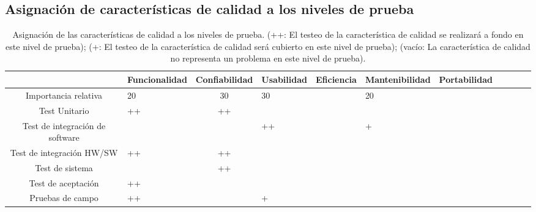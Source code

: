 \documentclass[11pt]{article}
\begin{document}
\subsection{Asignación de características de calidad a los niveles de prueba}
\FloatBarrier
\begin{table}[!ht]
    \centering

    \begin{tabularx}{\linewidth}{@{}|c|X|c|X|c|X|c|X|c|X|c|@{}}\hline \hline
        \rowcolor[HTML]{d6c6c3}
                                        & \bf Funcionalidad  & \bf Confiabilidad & \bf Usabilidad &
        \bf
        Eficiencia                      & \bf Mantenibilidad & \bf
        Portabilidad                                                                                \\ \hline
        \hline
        Importancia relativa            & 20                 &
        30                              & 30                 &                   & 20             &
        \\
        Test Unitario                   & ++                 & ++
                                        &                    &                   &                & \\
        Test de integración de software &                    &
                                        & ++                 &                   & +              &
        \\
        Test de integración HW/SW       & ++                 & ++
                                        &                    &                   &                &
        \\
        Test de sistema                 &                    & ++
                                        &                    &                   &                & \\
        Test de aceptación              & ++                 &
                                        &                    &                   &
                                        &
        \\
        Pruebas de campo                & ++                 &
                                        & +                  &                   &                &
        \\ \hline
    \end{tabularx}
    \caption{Asignación de las características de calidad a los niveles de
        prueba. (++: El testeo de la característica de calidad
        se realizará a fondo en este nivel de prueba); (+: El testeo de la
        característica de calidad será cubierto en este nivel de
        prueba); (vacío: La característica de calidad no representa un problema en este
        nivel de prueba).}

\end{table}
\end{document}
